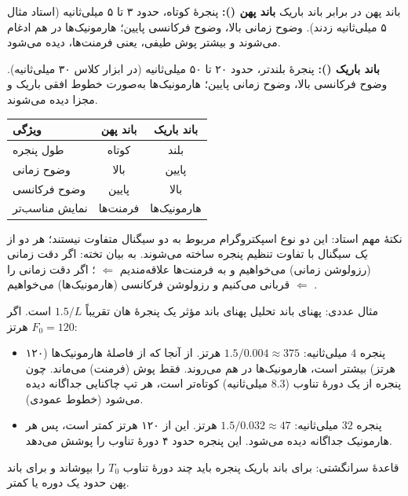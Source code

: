 \begin{definitionbox}{باند پهن در برابر باند باریک}
\textbf{باند پهن ():} پنجرهٔ کوتاه، حدود ۳ تا ۵ میلی‌ثانیه (استاد مثال ۵ میلی‌ثانیه زدند). وضوح زمانی بالا، وضوح فرکانسی پایین؛ هارمونیک‌ها در هم ادغام می‌شوند و بیشتر پوش طیفی، یعنی فرمنت‌ها، دیده می‌شود.

\textbf{باند باریک ():} پنجرهٔ بلندتر، حدود ۲۰ تا ۵۰ میلی‌ثانیه (در ابزار کلاس ۳۰ میلی‌ثانیه). وضوح فرکانسی بالا، وضوح زمانی پایین؛ هارمونیک‌ها به‌صورت خطوط افقی باریک و مجزا دیده می‌شوند.
\end{definitionbox}

\begin{center}
\begin{tabular}{lcc}
\toprule
ویژگی & باند پهن & باند باریک \\
\midrule
طول پنجره & کوتاه & بلند \\
وضوح زمانی & بالا & پایین \\
وضوح فرکانسی & پایین & بالا \\
نمایش مناسب‌تر & فرمنت‌ها & هارمونیک‌ها \\
\bottomrule
\end{tabular}
\end{center}

نکتهٔ مهم استاد: این دو نوع اسپکتروگرام مربوط به دو سیگنال متفاوت نیستند؛ هر دو از \emph{یک} سیگنال با تفاوت تنظیم پنجره ساخته می‌شوند. به بیان تخته: اگر دقت زمانی (رزولوشن زمانی) می‌خواهیم و به فرمنت‌ها علاقه‌مندیم $\Leftarrow$ ؛ اگر دقت زمانی را قربانی می‌کنیم و رزولوشن فرکانسی (هارمونیک‌ها) می‌خواهیم $\Leftarrow$ .

\begin{addedbox}{مثال عددی: پهنای باند تحلیل}
پهنای باند مؤثر یک پنجرهٔ هان تقریباً $1.5/L$ است. اگر $F_0=120$ هرتز:
\begin{itemize}
  \item پنجره $4$ میلی‌ثانیه: $1.5/0.004\approx 375$ هرتز. از آنجا که از فاصلهٔ هارمونیک‌ها (۱۲۰ هرتز) بیشتر است، هارمونیک‌ها در هم می‌روند. فقط پوش (فرمنت) می‌ماند. چون پنجره از یک دورهٔ تناوب ($8.3$ میلی‌ثانیه) کوتاه‌تر است، هر تپ چاکنایی جداگانه دیده می‌شود (خطوط عمودی).
  \item پنجره $32$ میلی‌ثانیه: $1.5/0.032\approx 47$ هرتز. این از ۱۲۰ هرتز کمتر است، پس هر هارمونیک جداگانه دیده می‌شود. این پنجره حدود ۴ دورهٔ تناوب را پوشش می‌دهد.
\end{itemize}
قاعدهٔ سرانگشتی: برای باند باریک پنجره باید چند دورهٔ تناوب $T_0$ را بپوشاند و برای باند پهن حدود یک دوره یا کمتر.
\end{addedbox}

